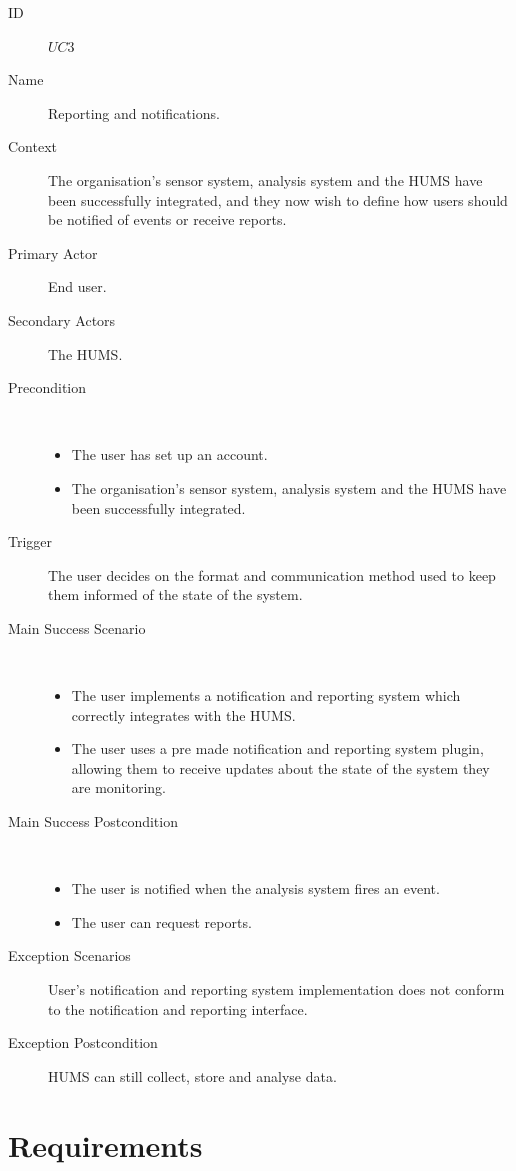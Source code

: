 \documentclass[10pt,a4paper]{article}
\begin{document}
\begin{description}
	\item[ID] $UC3$
	\item[Name] Reporting and notifications.
	\item[Context] The organisation's sensor system, analysis system and the HUMS
	               have been successfully integrated, and they now wish to define
	               how users should be notified of events or receive reports.
	\item[Primary Actor] End user.
	\item[Secondary Actors] The HUMS.
	\item[Precondition] ~
			\begin{itemize}
			\item The user has set up an account.
			\item The organisation's sensor system, analysis system and the HUMS have
			      been successfully integrated.
			\end{itemize}
	\item[Trigger] The user decides on the format and communication method used
	               to keep them informed of the state of the system.
	\item[Main Success Scenario] ~
			\begin{itemize}
				\item The user implements a notification and reporting system which
				      correctly integrates with the HUMS.
				\item The user uses a pre made notification and reporting system plugin,
				 allowing them to receive updates about the state of the
				      system they are monitoring.
			\end{itemize}
	\item[Main Success Postcondition] ~
			\begin{itemize}
				\item The user is notified when the analysis system fires an event.
				\item The user can request reports.
			\end{itemize}
	\item[Exception Scenarios] User's notification and reporting system
			implementation does not conform to the notification and reporting
			interface.
	\item[Exception Postcondition] HUMS can still collect, store and analyse data.
\end{description}


\section{Requirements}
\end{document}
